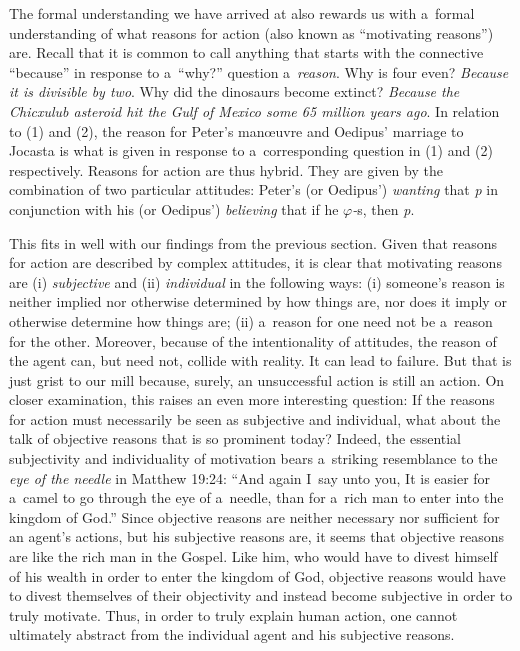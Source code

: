 The formal understanding we have arrived at also rewards us with a~formal understanding of what reasons for action (also known as ``motivating reasons'') are. Recall that it is common to call anything that starts with the connective ``because'' in response to a~``why?'' question a~\textit{reason}. Why is four even? \textit{Because it is divisible by two}. Why did the dinosaurs become extinct? \textit{Because the Chicxulub asteroid hit the Gulf of Mexico some 65 million years ago}. In relation to (1) and (2), the reason for Peter's manœuvre and Oedipus' marriage to Jocasta is what is given in response to a~corresponding question in (1) and (2) respectively. Reasons for action are thus hybrid. They are given by the combination of two particular attitudes: Peter's (or Oedipus') \textit{wanting} that \textit{p} in conjunction with his (or Oedipus') \textit{believing} that if he \textit{$\varphi $-}s, then \textit{p}.



This fits in well with our findings from the previous section. Given that reasons for action are described by complex attitudes, it is clear that motivating reasons are (i) \textit{subjective} and (ii) \textit{individual} in the following ways: (i) someone's reason is neither implied nor otherwise determined by how things are, nor does it imply or otherwise determine how things are; (ii) a~reason for one need not be a~reason for the other. Moreover, because of the intentionality of attitudes, the reason of the agent can, but need not, collide with reality. It can lead to failure. But that is just grist to our mill because, surely, an unsuccessful action is still an action. On closer examination, this raises an even more interesting question: If the reasons for action must necessarily be seen as subjective and individual, what about the talk of objective reasons that is so prominent today? Indeed, the essential subjectivity and individuality of motivation bears a~striking resemblance to the \textit{eye of the needle} in Matthew 19:24: ``And again I~say unto you, It is easier for a~camel to go through the eye of a~needle, than for a~rich man to enter into the kingdom of God.'' Since objective reasons are neither necessary nor sufficient for an agent's actions, but his subjective reasons are, it seems that objective reasons are like the rich man in the Gospel. Like him, who would have to divest himself of his wealth in order to enter the kingdom of God, objective reasons would have to divest themselves of their objectivity and instead become subjective in order to truly motivate. Thus, in order to truly explain human action, one cannot ultimately abstract from the individual agent and his subjective reasons.



